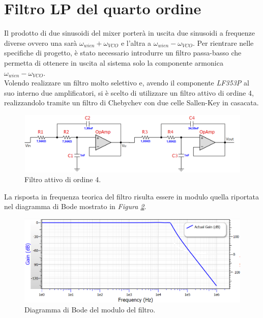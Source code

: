 \documentclass[titlepage]{report}
\begin{document}
\section{Filtro LP del quarto ordine}
	\label{sec:LP4}
	Il prodotto di due sinusoidi del mixer porterà in uscita due sinusoidi a frequenze diverse ovvero una sarà $\omega_{wien} + \omega_{VCO}$ e l'altra a $\omega_{wien} - \omega_{VCO}$. Per rientrare nelle specifiche di progetto, è stato necessario introdurre un filtro passa-basso che permetta di ottenere in uscita al sistema solo la componente armonica $\omega_{wien} - \omega_{VCO}$.
	\\ 
	Volendo realizzare un filtro molto selettivo e, avendo il componente \textit{LF353P} al suo interno due amplificatori, si è scelto di utilizzare un filtro attivo di ordine 4, realizzandolo tramite un filtro di Chebychev con due celle Sallen-Key in casacata. 
	
	\begin{figure}[H]
		\centering
		\includegraphics[scale=0.9]{Immagini/sch_lp4.png}
		\caption{Filtro attivo di ordine 4.}
		\label{fig:LP4}
	\end{figure}	
	
	\noindent La risposta in frequenza teorica del filtro risulta essere in modulo quella riportata nel diagramma di Bode mostrato in \textit{Figura \ref{fig:BodeLp4}}.
	
	\begin{figure}[H]
		\centering
		\includegraphics[scale=0.9]{Immagini/bode_teorico_lp4.png}
		\caption{Diagramma di Bode del modulo del filtro.}
		\label{fig:BodeLp4}
	\end{figure}
\end{document}
